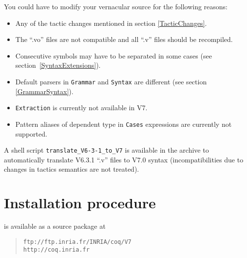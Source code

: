 \documentclass[11pt]{article}
\begin{document}
  You could have to modify your vernacular source for the following
  reasons:

  \begin{itemize}
 
  \item Any of the tactic changes mentioned in section \ref{TacticChanges}.

  \item The ``.vo'' files are not compatible and all ``.v'' files should
  be recompiled.

  \item Consecutive symbols may have to be separated in some cases (see
  section~\ref{SyntaxExtensions}).

  \item Default parsers in {\tt Grammar} and {\tt Syntax} are
  different (see section \ref{GrammarSyntax}).

  \item {\tt Extraction} is currently not available in {\Coq} V7.

  \item Pattern aliases of dependent type in \verb=Cases=
  expressions are currently not supported.

  \end{itemize}

A shell script \verb=translate_V6-3-1_to_V7= is available in the archive to
automatically translate V6.3.1 ``.v'' files to V7.0 syntax
(incompatibilities due to changes in tactics semantics are not
treated).


\section{Installation procedure}


{\Coq} is available as a source package at 

\begin{quote}
\verb|ftp://ftp.inria.fr/INRIA/coq/V7|\\
\verb|http://coq.inria.fr|
\end{quote}
\end{document}
